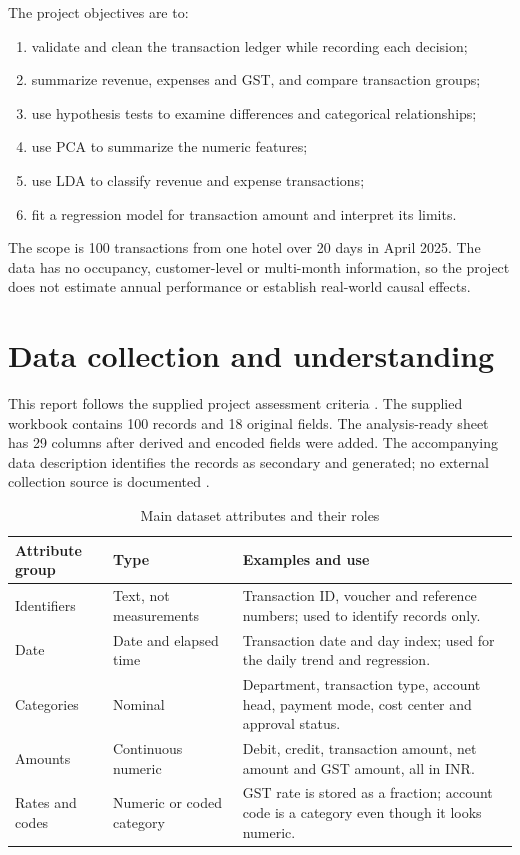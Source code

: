 \documentclass[11pt,a4paper]{article}
\begin{document}
The project objectives are to:
\begin{enumerate}
  \item validate and clean the transaction ledger while recording each decision;
  \item summarize revenue, expenses and GST, and compare transaction groups;
  \item use hypothesis tests to examine differences and categorical relationships;
  \item use PCA to summarize the numeric features;
  \item use LDA to classify revenue and expense transactions;
  \item fit a regression model for transaction amount and interpret its limits.
\end{enumerate}

The scope is 100 transactions from one hotel over 20 days in April 2025. The data has no occupancy, customer-level or multi-month information, so the project does not estimate annual performance or establish real-world causal effects.

\section{Data collection and understanding}
This report follows the supplied project assessment criteria \cite{rubric}. The supplied workbook contains 100 records and 18 original fields. The analysis-ready sheet has 29 columns after derived and encoded fields were added. The accompanying data description identifies the records as secondary and generated; no external collection source is documented \cite{dataset,description}.

\begin{table}[H]
\centering
\caption{Main dataset attributes and their roles}
\small
\begin{tabularx}{\textwidth}{>{\raggedright\arraybackslash}p{}>{\raggedright\arraybackslash}p{}X}
\toprule
Attribute group & Type & Examples and use\\
\midrule
Identifiers & Text, not measurements & Transaction ID, voucher and reference numbers; used to identify records only.\\
Date & Date and elapsed time & Transaction date and day index; used for the daily trend and regression.\\
Categories & Nominal & Department, transaction type, account head, payment mode, cost center and approval status.\\
Amounts & Continuous numeric & Debit, credit, transaction amount, net amount and GST amount, all in INR.\\
Rates and codes & Numeric or coded category & GST rate is stored as a fraction; account code is a category even though it looks numeric.\\
\bottomrule
\end{tabularx}
\end{table}
\end{document}
